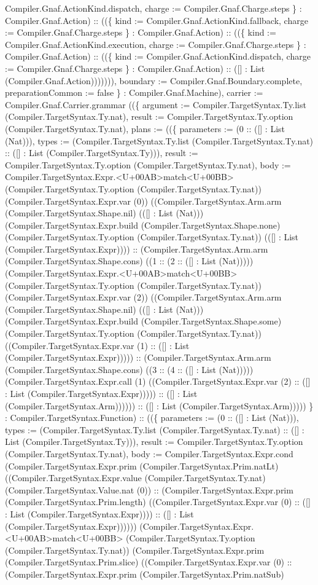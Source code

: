 \documentclass[11pt]{article}
\begin{document}
Compiler.Gnaf.ActionKind.dispatch, charge := Compiler.Gnaf.Charge.steps \} : Compiler.Gnaf.Action) :: ((\{ kind := Compiler.Gnaf.ActionKind.fallback, charge := Compiler.Gnaf.Charge.steps \} : Compiler.Gnaf.Action) :: ((\{ kind := Compiler.Gnaf.ActionKind.execution, charge := Compiler.Gnaf.Charge.steps \} : Compiler.Gnaf.Action) :: ((\{ kind := Compiler.Gnaf.ActionKind.dispatch, charge := Compiler.Gnaf.Charge.steps \} : Compiler.Gnaf.Action) :: ([] : List (Compiler.Gnaf.Action))))))), boundary := Compiler.Gnaf.Boundary.complete, preparationCommon := false \} : Compiler.Gnaf.Machine), carrier := Compiler.Gnaf.Carrier.grammar ((\{ argument := Compiler.TargetSyntax.Ty.list (Compiler.TargetSyntax.Ty.nat), result := Compiler.TargetSyntax.Ty.option (Compiler.TargetSyntax.Ty.nat), plans := ((\{ parameters := (0 :: ([] : List (Nat))), types := (Compiler.TargetSyntax.Ty.list (Compiler.TargetSyntax.Ty.nat) :: ([] : List (Compiler.TargetSyntax.Ty))), result := Compiler.TargetSyntax.Ty.option (Compiler.TargetSyntax.Ty.nat), body := Compiler.TargetSyntax.Expr.<U+00AB>match<U+00BB> (Compiler.TargetSyntax.Ty.option (Compiler.TargetSyntax.Ty.nat)) (Compiler.TargetSyntax.Expr.var (0)) ((Compiler.TargetSyntax.Arm.arm (Compiler.TargetSyntax.Shape.nil) (([] : List (Nat))) (Compiler.TargetSyntax.Expr.build (Compiler.TargetSyntax.Shape.none) (Compiler.TargetSyntax.Ty.option (Compiler.TargetSyntax.Ty.nat)) (([] : List (Compiler.TargetSyntax.Expr)))) :: (Compiler.TargetSyntax.Arm.arm (Compiler.TargetSyntax.Shape.cons) ((1 :: (2 :: ([] : List (Nat))))) (Compiler.TargetSyntax.Expr.<U+00AB>match<U+00BB> (Compiler.TargetSyntax.Ty.option (Compiler.TargetSyntax.Ty.nat)) (Compiler.TargetSyntax.Expr.var (2)) ((Compiler.TargetSyntax.Arm.arm (Compiler.TargetSyntax.Shape.nil) (([] : List (Nat))) (Compiler.TargetSyntax.Expr.build (Compiler.TargetSyntax.Shape.some) (Compiler.TargetSyntax.Ty.option (Compiler.TargetSyntax.Ty.nat)) ((Compiler.TargetSyntax.Expr.var (1) :: ([] : List (Compiler.TargetSyntax.Expr))))) :: (Compiler.TargetSyntax.Arm.arm (Compiler.TargetSyntax.Shape.cons) ((3 :: (4 :: ([] : List (Nat))))) (Compiler.TargetSyntax.Expr.call (1) ((Compiler.TargetSyntax.Expr.var (2) :: ([] : List (Compiler.TargetSyntax.Expr))))) :: ([] : List (Compiler.TargetSyntax.Arm)))))) :: ([] : List (Compiler.TargetSyntax.Arm))))) \} : Compiler.TargetSyntax.Function) :: ((\{ parameters := (0 :: ([] : List (Nat))), types := (Compiler.TargetSyntax.Ty.list (Compiler.TargetSyntax.Ty.nat) :: ([] : List (Compiler.TargetSyntax.Ty))), result := Compiler.TargetSyntax.Ty.option (Compiler.TargetSyntax.Ty.nat), body := Compiler.TargetSyntax.Expr.cond (Compiler.TargetSyntax.Expr.prim (Compiler.TargetSyntax.Prim.natLt) ((Compiler.TargetSyntax.Expr.value (Compiler.TargetSyntax.Ty.nat) (Compiler.TargetSyntax.Value.nat (0)) :: (Compiler.TargetSyntax.Expr.prim (Compiler.TargetSyntax.Prim.length) ((Compiler.TargetSyntax.Expr.var (0) :: ([] : List (Compiler.TargetSyntax.Expr)))) :: ([] : List (Compiler.TargetSyntax.Expr)))))) (Compiler.TargetSyntax.Expr.<U+00AB>match<U+00BB> (Compiler.TargetSyntax.Ty.option (Compiler.TargetSyntax.Ty.nat)) (Compiler.TargetSyntax.Expr.prim (Compiler.TargetSyntax.Prim.slice) ((Compiler.TargetSyntax.Expr.var (0) :: (Compiler.TargetSyntax.Expr.prim (Compiler.TargetSyntax.Prim.natSub) 
\end{document}
